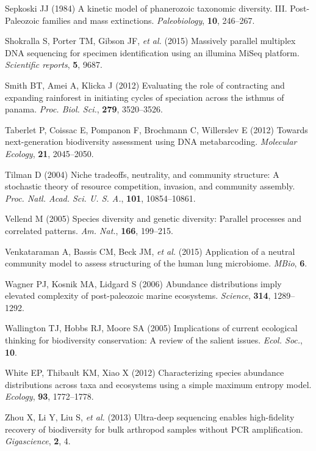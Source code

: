 \documentclass[
]{article}
\newlength{\cslhangindent}
\newlength{\cslentryspacingunit} %
\newenvironment{CSLReferences}[2] %
 {%
  \setlength{\parindent}{0pt}
  \ifodd #1
  \let\oldpar\par
  \def\par{\hangindent=\cslhangindent\oldpar}
  \fi
  \setlength{\parskip}{#2\cslentryspacingunit}
 }%
 {}
\begin{document}
\begin{CSLReferences}{1}{0}
\leavevmode{}%
Sepkoski JJ (1984) A kinetic model of phanerozoic taxonomic diversity.
{III}. {Post-Paleozoic} families and mass extinctions.
\emph{Paleobiology}, \textbf{10}, 246--267.

\leavevmode{}%
Shokralla S, Porter TM, Gibson JF, \emph{et al.} (2015) Massively
parallel multiplex DNA sequencing for specimen identification using an
illumina MiSeq platform. \emph{Scientific reports}, \textbf{5}, 9687.

\leavevmode{}%
Smith BT, Amei A, Klicka J (2012) Evaluating the role of contracting and
expanding rainforest in initiating cycles of speciation across the
isthmus of panama. \emph{Proc. Biol. Sci.}, \textbf{279}, 3520--3526.

\leavevmode{}%
Taberlet P, Coissac E, Pompanon F, Brochmann C, Willerslev E (2012)
Towards next-generation biodiversity assessment using DNA metabarcoding.
\emph{Molecular Ecology}, \textbf{21}, 2045--2050.

\leavevmode{}%
Tilman D (2004) Niche tradeoffs, neutrality, and community structure: A
stochastic theory of resource competition, invasion, and community
assembly. \emph{Proc. Natl. Acad. Sci. U. S. A.}, \textbf{101},
10854--10861.

\leavevmode{}%
Vellend M (2005) Species diversity and genetic diversity: Parallel
processes and correlated patterns. \emph{Am. Nat.}, \textbf{166},
199--215.

\leavevmode{}%
Venkataraman A, Bassis CM, Beck JM, \emph{et al.} (2015) Application of
a neutral community model to assess structuring of the human lung
microbiome. \emph{MBio}, \textbf{6}.

\leavevmode{}%
Wagner PJ, Kosnik MA, Lidgard S (2006) Abundance distributions imply
elevated complexity of post-paleozoic marine ecosystems. \emph{Science},
\textbf{314}, 1289--1292.

\leavevmode{}%
Wallington TJ, Hobbs RJ, Moore SA (2005) Implications of current
ecological thinking for biodiversity conservation: A review of the
salient issues. \emph{Ecol. Soc.}, \textbf{10}.

\leavevmode{}%
White EP, Thibault KM, Xiao X (2012) Characterizing species abundance
distributions across taxa and ecosystems using a simple maximum entropy
model. \emph{Ecology}, \textbf{93}, 1772--1778.

\leavevmode{}%
Zhou X, Li Y, Liu S, \emph{et al.} (2013) Ultra-deep sequencing enables
high-fidelity recovery of biodiversity for bulk arthropod samples
without PCR amplification. \emph{Gigascience}, \textbf{2}, 4.

\end{CSLReferences}
\end{document}
